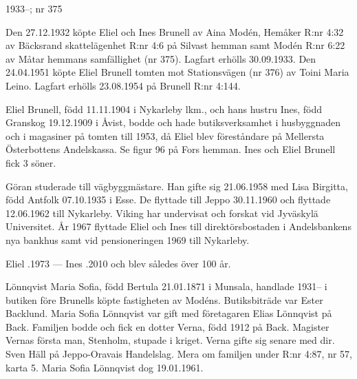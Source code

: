 
 1933--; nr 375

Den 27.12.1932 köpte Eliel och Ines Brunell av Aina Modén, Hemåker R:nr 4:32 av Bäcksrand skattelägenhet R:nr 4:6 på Silvast hemman samt Modén R:nr 6:22 av Måtar hemmans samfällighet (nr 375). Lagfart erhölls 30.09.1933. Den 24.04.1951 köpte Eliel Brunell tomten mot Stationsvägen (nr 376) av Toini Maria Leino. Lagfart erhölls 23.08.1954 på Brunell R:nr 4:144.

Eliel Brunell, född 11.11.1904 i Nykarleby lkm., och hans hustru Ines, född Granskog 19.12.1909 i Åvist, bodde och hade butiksverksamhet i husbyggnaden och i magasiner på tomten till 1953, då Eliel blev föreståndare på Mellersta Österbottens Andelskassa. Se figur 96 på Fors hemman. Ines och Eliel Brunell fick 3 söner.
\begin{jhchildren}
  \item {}
  \item {}
  \item {}
\end{jhchildren}
Göran studerade till vägbyggmästare. Han gifte sig 21.06.1958 med Lisa Birgitta, född Antfolk 07.10.1935 i Esse. De flyttade till Jeppo 30.11.1960 och flyttade 12.06.1962 till Nykarleby. Viking har undervisat och forskat vid Jyväskylä Universitet. År 1967 flyttade Eliel och Ines till direktörsbostaden i Andelsbankens nya bankhus samt vid pensioneringen 1969 till Nykarleby.

Eliel .1973  --- Ines .2010 och blev således över 100 år.

Lönnqvist Maria Sofia, född Bertula 21.01.1871 i Munsala, handlade 1931-- i butiken före Brunells köpte fastigheten av Modéns. Butiksbiträde var Ester Backlund. Maria Sofia Lönnqvist var gift med företagaren Elias Lönnqvist på Back. Familjen bodde och fick en dotter Verna, född 1912 på Back. Magister Vernas första man, Stenholm, stupade i kriget. Verna gifte sig senare med dir. Sven Häll på Jeppo-Oravais Handelslag. Mera om familjen under R:nr 4:87, nr 57, karta 5. Maria Sofia Lönnqvist dog 19.01.1961.



